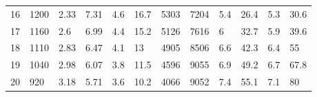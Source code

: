 \documentclass[12pt, a4paper]{article}
\begin{document}
\begin{table}
\begin{tabular}[p]{| M{1cm} | M{1.5cm} | M{1.5cm} | M{1.5cm} | M{1.5cm} | M{1.5cm} | M{1.5cm} | M{1.5cm} | M{1.5cm} | M{1.5cm} | M{1.5cm} | M{1.5cm} |}
        16 & 1200 & 2.33 & 7.31 & 4.6 & 16.7 & 5303 & 7204 & 5.4 & 26.4 & 5.3 & 30.6 \\
        17 & 1160 & 2.6 & 6.99 & 4.4 & 15.2 & 5126 & 7616 & 6 & 32.7 & 5.9 & 39.6 \\
        18 & 1110 & 2.83 & 6.47 & 4.1 & 13 & 4905 & 8506 & 6.6 & 42.3 & 6.4 & 55 \\
        19 & 1040 & 2.98 & 6.07 & 3.8 & 11.5 & 4596 & 9055 & 6.9 & 49.2 & 6.7 & 67.8 \\
        20 & 920 & 3.18 & 5.71 & 3.6 & 10.2 & 4066 & 9052 & 7.4 & 55.1 & 7.1 & 80 \\
        \hline
        \end{tabular}
        \label{tb1}
    \end{table}
    
\end{document}
